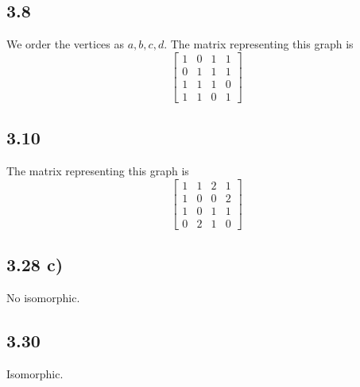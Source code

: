 \documentclass[10pt]{ctexart}
\begin{document}
    \subsection*{3.8}
    We order the vertices as $a, b, c, d$. The matrix representing this graph is 
    $$\left[
    \begin{matrix}
        1 & 0 & 1 & 1 \\
        0 & 1 & 1 & 1 \\
        1 & 1 & 1 & 0 \\
        1 & 1 & 0 & 1
    \end{matrix}
    \right]$$
    \subsection*{3.10}
    The matrix representing this graph is 
    $$\left[
    \begin{matrix}
        1 & 1 & 2 & 1 \\
        1 & 0 & 0 & 2 \\
        1 & 0 & 1 & 1 \\
        0 & 2 & 1 & 0
    \end{matrix}
    \right]$$
    \subsection*{3.28 \textbf{c)}}
    No isomorphic.
    \subsection*{3.30}
    Isomorphic.
\end{document}
